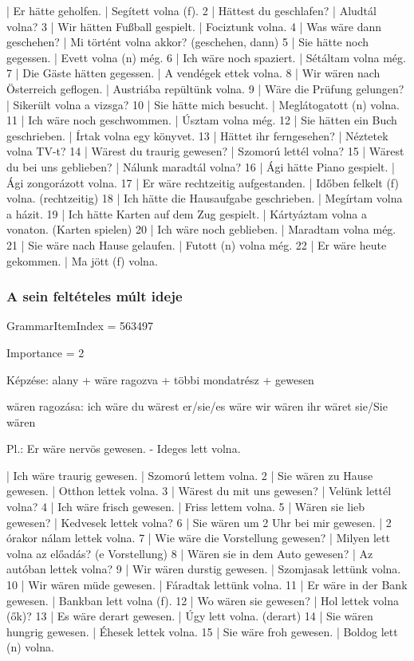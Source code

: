 \documentclass{article}
\newenvironment{desc}{\verbatim}{\endverbatim}
\newenvironment{exmp}{\verbatim}{\endverbatim}
\begin{document}
\begin{exmp}
1 | Er hätte geholfen. | Segített volna (f).
2 | Hättest du geschlafen? | Aludtál volna?
3 | Wir hätten Fußball gespielt. | Fociztunk volna.
4 | Was wäre dann geschehen? | Mi történt volna akkor? (geschehen, dann)
5 | Sie hätte noch gegessen. | Evett volna (n) még.
6 | Ich wäre noch spaziert. | Sétáltam volna még.
7 | Die Gäste hätten gegessen. | A vendégek ettek volna.
8 | Wir wären nach Österreich geflogen. | Austriába repültünk volna.
9 | Wäre die Prüfung gelungen? | Sikerült volna a vizsga?
10 | Sie hätte mich besucht. | Meglátogatott (n) volna.
11 | Ich wäre noch geschwommen. | Úsztam volna még.
12 | Sie hätten ein Buch geschrieben. | Írtak volna egy könyvet.
13 | Hättet ihr ferngesehen? | Néztetek volna TV-t?
14 | Wärest du traurig gewesen? | Szomorú lettél volna?
15 | Wärest du bei uns geblieben? | Nálunk maradtál volna?
16 | Ági hätte Piano gespielt. | Ági zongorázott volna.
17 | Er wäre rechtzeitig aufgestanden. | Időben felkelt (f) volna. (rechtzeitig)
18 | Ich hätte die Hausaufgabe geschrieben. | Megírtam volna a házit.
19 | Ich hätte Karten auf dem Zug gespielt. | Kártyáztam volna a vonaton. (Karten spielen)
20 | Ich wäre noch geblieben. | Maradtam volna még.
21 | Sie wäre nach Hause gelaufen. | Futott (n) volna még.
22 | Er wäre heute gekommen. | Ma jött (f) volna.
\end{exmp}

\subsubsection{A sein feltételes múlt ideje}

GrammarItemIndex = 563497

Importance = 2

\begin{desc}
Képzése:
alany + wäre ragozva + többi mondatrész + gewesen

wären ragozása:
ich wäre
du wärest
er/sie/es wäre
wir wären
ihr wäret
sie/Sie wären

Pl.: Er wäre nervös gewesen. - Ideges lett volna.
\end{desc}

\begin{exmp}
1 | Ich wäre traurig gewesen. | Szomorú lettem volna.
2 | Sie wären zu Hause gewesen. | Otthon lettek volna.
3 | Wärest du mit uns gewesen? | Velünk lettél volna?
4 | Ich wäre frisch gewesen. | Friss lettem volna.
5 | Wären sie lieb gewesen? | Kedvesek lettek volna?
6 | Sie wären um 2 Uhr bei mir gewesen. | 2 órakor nálam lettek volna.
7 | Wie wäre die Vorstellung gewesen? | Milyen lett volna az előadás? (e Vorstellung)
8 | Wären sie in dem Auto gewesen? | Az autóban lettek volna?
9 | Wir wären durstig gewesen. | Szomjasak lettünk volna.
10 | Wir wären müde gewesen. | Fáradtak lettünk volna.
11 | Er wäre in der Bank gewesen. | Bankban lett volna (f).
12 | Wo wären sie gewesen? | Hol lettek volna (ők)?
13 | Es wäre derart gewesen. | Úgy lett volna. (derart)
14 | Sie wären hungrig gewesen. | Éhesek lettek volna.
15 | Sie wäre froh gewesen. | Boldog lett (n) volna.
\end{exmp}
\end{document}
